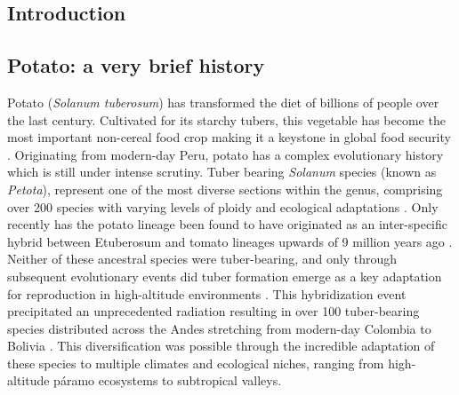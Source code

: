 \begin{refsection}
\chapter[Introduction]{Introduction}
\label{cha:Chapter1}
\vspace*{\fill}


\newpage

\section{Potato: a very brief
history}\label{potato-a-very-brief-history}

Potato (\emph{Solanum tuberosum}) has transformed the diet of billions
of people over the last century. Cultivated for its starchy tubers, this
vegetable has become the most important non-cereal food crop making it a
keystone in global food security \parencite{Zaheer2016}. Originating from
modern-day Peru, potato has a complex evolutionary history which is
still under intense scrutiny. Tuber bearing \emph{Solanum} species
(known as \emph{Petota}), represent one of the most diverse sections
within the genus, comprising over 200 species with varying levels of
ploidy and ecological adaptations \parencite{Spooner2014}. Only recently
has the potato lineage been found to have originated as an
inter-specific hybrid between Etuberosum and tomato lineages upwards of
9 million years ago \parencite{Zhang2025}. Neither of these ancestral
species were tuber-bearing, and only through subsequent evolutionary
events did tuber formation emerge as a key adaptation for reproduction
in high-altitude environments \parencite{Hardigan2017}. This
hybridization event precipitated an unprecedented radiation resulting in
over 100 tuber-bearing species distributed across the Andes stretching
from modern-day Colombia to Bolivia \parencite{Spooner2014}. This
diversification was possible through the incredible adaptation of these
species to multiple climates and ecological niches, ranging from
high-altitude páramo ecosystems to subtropical valleys.


\end{refsection}

